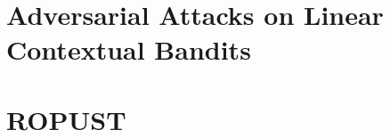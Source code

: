 \begin{appendices}



    
    

\chapter{Adversarial Attacks on Linear Contextual Bandits}
\label{paper:banditsattacks}






\chapter{ROPUST}
\label{paper:ropust}




% 



% 


% 

% 

% 

\end{appendices}
